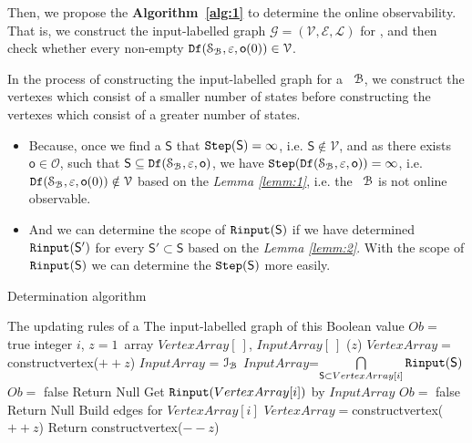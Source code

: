 
 Then, we propose the {\bf Algorithm~\ref{alg:1}} to determine the online observability. That is, we construct the input-labelled graph $\mathcal{G}=(\mathcal{V}, \mathcal{E}, \mathcal{L})$ for  \BCN, and then check whether every non-empty ${\tt Df}(\mathcal{S}_{\mathcal{B}},\varepsilon, \mathsf{o}(0))\in \mathcal{V}$.
 
 In the process of constructing the input-labelled graph for a \BCN\ ${\mathcal{B}}$, we construct the vertexes which consist of a smaller number of states before constructing the vertexes which consist of a greater number of states.
\begin{itemize}
\item  Because, once we find a $\mathsf{S}$ that ${\tt Step}(\mathsf{S})= \infty$, i.e. $\mathsf{S}\notin \mathcal{V}$, and as there exists $\mathsf{o}\in \mathcal{O}$, such that $\mathsf{S}\subseteq {\tt Df}(\mathcal{S}_{\mathcal{B}},\varepsilon, \mathsf{o})$, we have ${\tt Step}({\tt Df}(\mathcal{S}_{\mathcal{B}},\varepsilon, \mathsf{o}))= \infty$, i.e. ${\tt Df}(\mathcal{S}_{\mathcal{B}},\varepsilon, \mathsf{o}(0))\notin \mathcal{V}$ based on the {\em Lemma \ref{lemm:1}}, i.e. the \BCN\ ${\mathcal{B}}$ is not online observable.
\item  And we can determine the scope of ${\tt Rinput}(\mathsf{S})$ if we have determined ${\tt Rinput}(\mathsf{S}')$ for every $\mathsf{S}'\subset\mathsf{S}$ based on the {\em Lemma \ref{lemm:2}}. With the scope of ${\tt Rinput}(\mathsf{S})$ we can determine the ${\tt Step}(\mathsf{S})$ more easily.
 \end{itemize} %

\begin{algorithm}[h]
\caption{Determination algorithm}
\begin{algorithmic}[1]
\REQUIRE 
The updating rules of a \BCN
\ENSURE  
The input-labelled graph of this \BCN
\STATE Boolean value $Ob=$ true 
\STATE integer $i$, $z=1$\
\STATE array $VertexArray[\ ]$, $InputArray[\ ]$
($z$)
\STATE $VertexArray=${\sf constructvertex}($++z$)
\STATE $InputArray$ = $\mathcal{I}_{\mathcal{B}}$ 
\ELSE
\STATE $InputArray$=$\mathop{\bigcap}\limits_{\mathsf{S}\subset VertexArray[i]} {\tt Rinput}(\mathsf{S}) $ 
\IF{($InputArray==\emptyset$)}
\STATE  $Ob=$ false 
\STATE Return Null
\ENDIF
\ENDIF
\STATE Get ${\tt Rinput}(VertexArray[i])$ by $InputArray$ 
\STATE  $Ob=$ false 
\STATE Return Null
\ENDIF
\STATE Build edges for $VertexArray[i]$ 
\ENDFOR
\STATE $VertexArray=${\sf constructvertex}($++z$)
\ENDWHILE
\STATE Return {\sf constructvertex}($--z$)
\end{algorithmic}
 \label{alg:1}
\end{algorithm}


